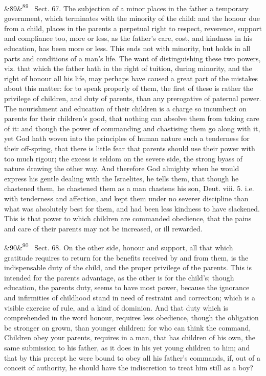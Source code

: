 \documentclass[12pt]{article}
\newcommand{\para}[1][]{\par\noindent\ifx&#1&\else\textsuperscript{\footnotesize #1}~\fi}
\begin{document}
\para[89] Sect. 67. The subjection of a minor places in the father a temporary government, which terminates with the minority of the child: and the honour due from a child, places in the parents a perpetual right to respect, reverence, support and compliance too, more or less, as the father's care, cost, and kindness in his education, has been more or less. This ends not with minority, but holds in all parts and conditions of a man's life. The want of distinguishing these two powers, viz. that which the father hath in the right of tuition, during minority, and the right of honour all his life, may perhaps have caused a great part of the mistakes about this matter: for to speak properly of them, the first of these is rather the privilege of children, and duty of parents, than any prerogative of paternal power. The nourishment and education of their children is a charge so incumbent on parents for their children's good, that nothing can absolve them from taking care of it: and though the power of commanding and chastising them go along with it, yet God hath woven into the principles of human nature such a tenderness for their off-spring, that there is little fear that parents should use their power with too much rigour; the excess is seldom on the severe side, the strong byass of nature drawing the other way. And therefore God almighty when he would express his gentle dealing with the Israelites, he tells them, that though he chastened them, he chastened them as a man chastens his son, Deut. viii. 5. i.e. with tenderness and affection, and kept them under no severer discipline than what was absolutely best for them, and had been less kindness to have slackened. This is that power to which children are commanded obedience, that the pains and care of their parents may not be increased, or ill rewarded.

\para[90] Sect. 68. On the other side, honour and support, all that which gratitude requires to return for the benefits received by and from them, is the indispensable duty of the child, and the proper privilege of the parents. This is intended for the parents advantage, as the other is for the child's; though education, the parents duty, seems to have most power, because the ignorance and infirmities of childhood stand in need of restraint and correction; which is a visible exercise of rule, and a kind of dominion. And that duty which is comprehended in the word honour, requires less obedience, though the obligation be stronger on grown, than younger children: for who can think the command, Children obey your parents, requires in a man, that has children of his own, the same submission to his father, as it does in his yet young children to him; and that by this precept he were bound to obey all his father's commands, if, out of a conceit of authority, he should have the indiscretion to treat him still as a boy?
\end{document}
